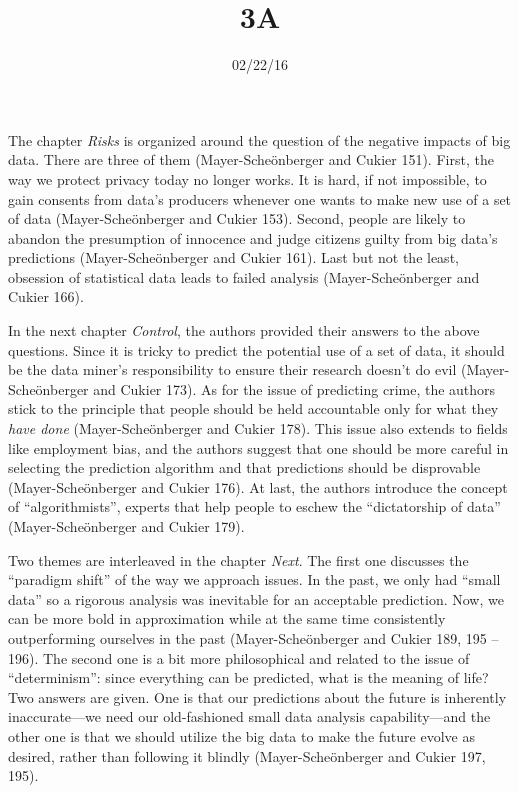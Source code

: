 \documentclass{writing}
\title{3A}
\date{02/22/16}
\begin{document}
\maketitle

The chapter \emph{Risks} is organized around the question of the
negative impacts of big data. There are three of them
(Mayer-Scheönberger and Cukier 151). First, the way we protect privacy
today no longer works. It is hard, if not impossible, to gain consents
from data's producers whenever one wants to make new use of a set of
data (Mayer-Scheönberger and Cukier 153). Second, people are likely to
abandon the presumption of innocence and judge citizens guilty from big
data's predictions (Mayer-Scheönberger and Cukier 161). Last but not the
least, obsession of statistical data leads to failed analysis
(Mayer-Scheönberger and Cukier 166).

In the next chapter \emph{Control}, the authors provided their answers
to the above questions. Since it is tricky to predict the potential use
of a set of data, it should be the data miner's responsibility to ensure
their research doesn't do evil (Mayer-Scheönberger and Cukier 173). As
for the issue of predicting crime, the authors stick to the principle
that people should be held accountable only for what they \emph{have
done} (Mayer-Scheönberger and Cukier 178). This issue also extends to
fields like employment bias, and the authors suggest that one should be
more careful in selecting the prediction algorithm and that predictions
should be disprovable (Mayer-Scheönberger and Cukier 176). At last, the
authors introduce the concept of ``algorithmists'', experts that help
people to eschew the ``dictatorship of data'' (Mayer-Scheönberger and
Cukier 179).

Two themes are interleaved in the chapter \emph{Next}. The first one
discusses the ``paradigm shift'' of the way we approach issues. In the
past, we only had ``small data'' so a rigorous analysis was inevitable
for an acceptable prediction. Now, we can be more bold in approximation
while at the same time consistently outperforming ourselves in the past
(Mayer-Scheönberger and Cukier 189, 195 -- 196). The second one is a bit
more philosophical and related to the issue of ``determinism'': since
everything can be predicted, what is the meaning of life? Two answers
are given. One is that our predictions about the future is inherently
inaccurate---we need our old-fashioned small data analysis
capability---and the other one is that we should utilize the big data to
make the future evolve as desired, rather than following it blindly
(Mayer-Scheönberger and Cukier 197, 195).
\end{document}
